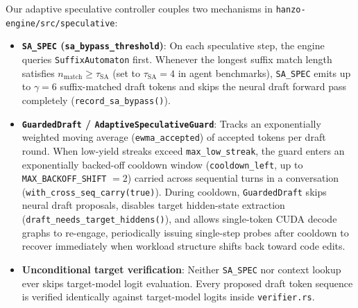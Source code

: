 \documentclass[11pt,a4paper]{article}
\begin{document}
Our adaptive speculative controller couples two mechanisms in \texttt{hanzo-engine/src/speculative}:
\begin{itemize}[noitemsep]
  \item \textbf{\texttt{SA\_SPEC} (\texttt{sa\_bypass\_threshold})}: On each speculative step, the engine queries \texttt{SuffixAutomaton} first. Whenever the longest suffix match length satisfies $n_{\text{match}} \ge \tau_{\text{SA}}$ (set to $\tau_{\text{SA}} = 4$ in agent benchmarks), \texttt{SA\_SPEC} emits up to $\gamma = 6$ suffix-matched draft tokens and skips the neural draft forward pass completely (\texttt{record\_sa\_bypass()}).
  \item \textbf{\texttt{GuardedDraft} / \texttt{AdaptiveSpeculativeGuard}}: Tracks an exponentially weighted moving average (\texttt{ewma\_accepted}) of accepted tokens per draft round. When low-yield streaks exceed \texttt{max\_low\_streak}, the guard enters an exponentially backed-off cooldown window (\texttt{cooldown\_left}, up to \texttt{MAX\_BACKOFF\_SHIFT} $= 2$) carried across sequential turns in a conversation (\texttt{with\_cross\_seq\_carry(true)}). During cooldown, \texttt{GuardedDraft} skips neural draft proposals, disables target hidden-state extraction (\texttt{draft\_needs\_target\_hiddens()}), and allows single-token CUDA decode graphs to re-engage, periodically issuing single-step probes after cooldown to recover immediately when workload structure shifts back toward code edits.
  \item \textbf{Unconditional target verification}: Neither \texttt{SA\_SPEC} nor context lookup ever skips target-model logit evaluation. Every proposed draft token sequence is verified identically against target-model logits inside \texttt{verifier.rs}.
\end{itemize}
\end{document}
